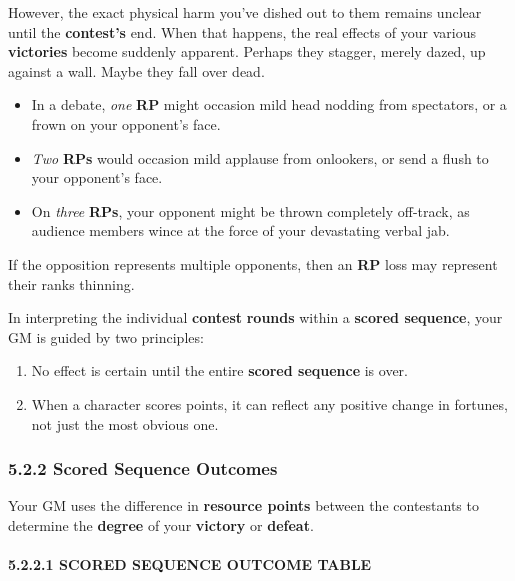 \documentclass[
  11pt,
]{article}
\providecommand{\tightlist}{%
  \setlength{\itemsep}{0pt}\setlength{\parskip}{0pt}}
\begin{document}
However, the exact physical harm you've dished out to them remains
unclear until the \textbf{contest's} end. When that happens, the real
effects of your various \textbf{victories} become suddenly apparent.
Perhaps they stagger, merely dazed, up against a wall. Maybe they fall
over dead.

\begin{itemize}
\tightlist
\item
  In a debate, \emph{one} \textbf{RP} might occasion mild head nodding
  from spectators, or a frown on your opponent's face.
\item
  \emph{Two} \textbf{RPs} would occasion mild applause from onlookers,
  or send a flush to your opponent's face.
\item
  On \emph{three} \textbf{RPs}, your opponent might be thrown completely
  off-track, as audience members wince at the force of your devastating
  verbal jab.
\end{itemize}

If the opposition represents multiple opponents, then an \textbf{RP}
loss may represent their ranks thinning.

In interpreting the individual \textbf{contest} \textbf{rounds} within a
\textbf{scored sequence}, your GM is guided by two principles:

\begin{enumerate}
\def\labelenumi{\arabic{enumi}.}
\tightlist
\item
  No effect is certain until the entire \textbf{scored sequence} is
  over.
\item
  When a character scores points, it can reflect any positive change in
  fortunes, not just the most obvious one.
\end{enumerate}

\hypertarget{scored-sequence-outcomes}{%
\subsubsection{5.2.2 Scored Sequence
Outcomes}\label{scored-sequence-outcomes}}

Your GM uses the difference in \textbf{resource points} between the
contestants to determine the \textbf{degree} of your \textbf{victory} or
\textbf{defeat}.

\hypertarget{scored-sequence-outcome-table}{%
\paragraph{5.2.2.1 SCORED SEQUENCE OUTCOME
TABLE}\label{scored-sequence-outcome-table}}
\end{document}
